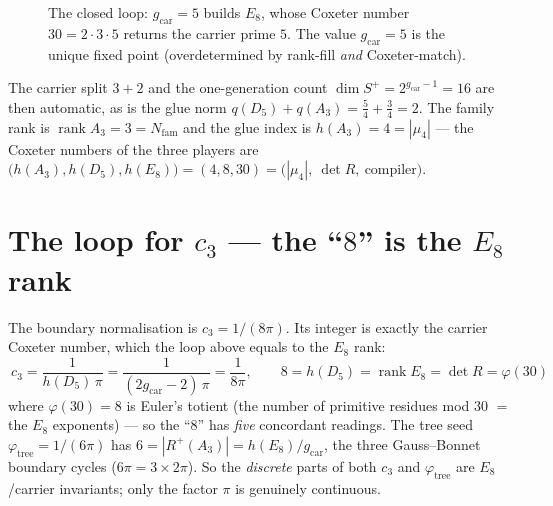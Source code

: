 \documentclass[11pt,a4paper]{article}
\newcommand{\gcar}{g_{\mathrm{car}}}
\newcommand{\Nfam}{N_{\mathrm{fam}}}
\newcommand{\cthree}{c_3}
\theoremstyle{definition}
\begin{document}
\begin{figure}[h]\centering
{}
\caption{\small The closed loop: $\gcar=5$ builds $E_8$, whose Coxeter number $30=2\cdot3\cdot5$ returns
the carrier prime $5$. The value $\gcar=5$ is the unique fixed point (overdetermined by rank-fill
\emph{and} Coxeter-match).}
\end{figure}

\noindent The carrier split $3+2$ and the one-generation count $\dim S^+=2^{\gcar-1}=16$ are then
automatic, as is the glue norm $q(D_5)+q(A_3)=\tfrac54+\tfrac34=2$. The family rank is
$\operatorname{rank}A_3=3=\Nfam$ and the glue index is $h(A_3)=4=|\mu_4|$ --- the Coxeter numbers of the
three players are $\bigl(h(A_3),h(D_5),h(E_8)\bigr)=(4,8,30)=\bigl(|\mu_4|,\ \det R,\ \text{compiler}\bigr)$.

\section{The loop for $\cthree$ --- the ``$8$'' is the $E_8$ rank}
The boundary normalisation is $\cthree=1/(8\pi)$. Its integer is exactly the carrier Coxeter number,
which the loop above equals to the $E_8$ rank:
\[
  \boxed{\ \cthree=\frac{1}{h(D_5)\,\pi}=\frac{1}{(2\gcar-2)\,\pi}=\frac{1}{8\pi},\qquad
  8=h(D_5)=\operatorname{rank}E_8=\det R=\varphi(30)\ }
\]
where $\varphi(30)=8$ is Euler's totient (the number of primitive residues mod $30$ $=$ the $E_8$
exponents) --- so the ``$8$'' has \emph{five} concordant readings. The tree seed
$\varphi_{\mathrm{tree}}=1/(6\pi)$ has $6=|R^+(A_3)|=h(E_8)/\gcar$, the three Gauss--Bonnet boundary
cycles ($6\pi=3\times2\pi$). So the \emph{discrete} parts of both $\cthree$ and $\varphi_{\mathrm{tree}}$
are $E_8$/carrier invariants; only the factor $\pi$ is genuinely continuous.
\end{document}
